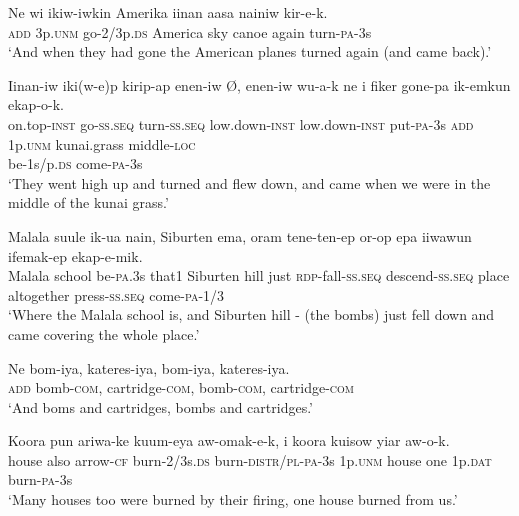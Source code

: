\ea\label{ex:a:x66}
\gll  Ne  wi  ikiw-iwkin  Amerika  iinan  aasa  nainiw  kir-e-k. \\
\textsc{add}  3p.\textsc{unm}  go-2/3p.\textsc{ds}  America  sky  canoe  again  turn-\textsc{pa}-3s \\
\glt ‘And when they had gone the American planes turned again (and came back).’ \\
\z


\ea\label{ex:a:x67}
\gll  Iinan-iw  iki(w-e)p  kirip-ap  enen-iw  Ø, enen-iw  wu-a-k  ne  i  fiker  gone-pa  ik-emkun  ekap-o-k. \\
on.top-\textsc{inst}  go-\textsc{ss.seq}  turn-\textsc{ss.seq}  low.down-\textsc{inst}   low.down-\textsc{inst}  put-\textsc{pa}-3s  \textsc{add}  1p.\textsc{unm}  kunai.grass  middle-\textsc{loc} \\
be-1s/p.\textsc{ds}  come-\textsc{pa}-3s \\
\glt ‘They went high up and turned and flew down, and came when we were in the middle of the kunai grass.’ \\
\z


\ea\label{ex:a:x68}
\gll  Malala  suule  ik-ua  nain,  Siburten  ema,  oram  tene-ten-ep  or-op  epa  iiwawun  ifemak-ep  ekap-e-mik. \\
Malala  school  be-\textsc{pa}.3s  that1  Siburten  hill  just  \textsc{rdp}-fall-\textsc{ss.seq} descend-\textsc{ss.seq}  place  altogether  press-\textsc{ss.seq}  come-\textsc{pa}-1/3 \\
\glt ‘Where the Malala school is, and Siburten hill - (the bombs) just fell down and came covering the whole place.’ \\
\z


\ea\label{ex:a:x69}
\gll  Ne  bom-iya,  kateres-iya,  bom-iya,  kateres-iya. \\
\textsc{add}  bomb-\textsc{com},  cartridge-\textsc{com},  bomb-\textsc{com},  cartridge-\textsc{com} \\
\glt ‘And boms and cartridges, bombs and cartridges.’ \\
\z


\ea\label{ex:a:x70}
\gll  Koora  pun  ariwa-ke  kuum-eya  aw-omak-e-k,  i  koora  kuisow  yiar  aw-o-k. \\
house  also  arrow-\textsc{cf}  burn-2/3s.\textsc{ds}  burn-\textsc{distr}/\textsc{pl}-\textsc{pa}-3s 1p.\textsc{unm}  house  one  1p.\textsc{dat}  burn-\textsc{pa}-3s \\
\glt ‘Many houses too were burned by their firing, one house burned from us.’ \\
\z


